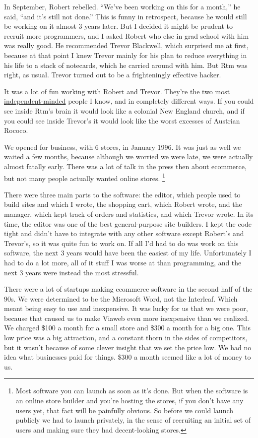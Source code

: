 In September, Robert rebelled. ``We've been working on this for a
month,'' he said, ``and it's still not done.'' This is funny in
retrospect, because he would still be working on it almost 3 years
later. But I decided it might be prudent to recruit more programmers,
and I asked Robert who else in grad school with him was really good. He
recommended Trevor Blackwell, which surprised me at first, because at
that point I knew Trevor mainly for his plan to reduce everything in his
life to a stack of notecards, which he carried around with him. But Rtm
was right, as usual. Trevor turned out to be a frighteningly effective
hacker.

It was a lot of fun working with Robert and Trevor. They're the two most
\href{think.html}{independent-minded} people I know, and in completely
different ways. If you could see inside Rtm's brain it would look like a
colonial New England church, and if you could see inside Trevor's it
would look like the worst excesses of Austrian Rococo.

We opened for business, with 6 stores, in January 1996. It was just as
well we waited a few months, because although we worried we were late,
we were actually almost fatally early. There was a lot of talk in the
press then about ecommerce, but not many people actually wanted online
stores. \footnote{Most software you can launch as soon as it's done. But when the
software is an online store builder and you're hosting the stores, if
you don't have any users yet, that fact will be painfully obvious. So
before we could launch publicly we had to launch privately, in the sense
of recruiting an initial set of users and making sure they had
decent-looking stores.}

There were three main parts to the software: the editor, which people
used to build sites and which I wrote, the shopping cart, which Robert
wrote, and the manager, which kept track of orders and statistics, and
which Trevor wrote. In its time, the editor was one of the best
general-purpose site builders. I kept the code tight and didn't have to
integrate with any other software except Robert's and Trevor's, so it
was quite fun to work on. If all I'd had to do was work on this
software, the next 3 years would have been the easiest of my life.
Unfortunately I had to do a lot more, all of it stuff I was worse at
than programming, and the next 3 years were instead the most stressful.

There were a lot of startups making ecommerce software in the second
half of the 90s. We were determined to be the Microsoft Word, not the
Interleaf. Which meant being easy to use and inexpensive. It was lucky
for us that we were poor, because that caused us to make Viaweb even
more inexpensive than we realized. We charged \$100 a month for a small
store and \$300 a month for a big one. This low price was a big
attraction, and a constant thorn in the sides of competitors, but it
wasn't because of some clever insight that we set the price low. We had
no idea what businesses paid for things. \$300 a month seemed like a lot
of money to us.

